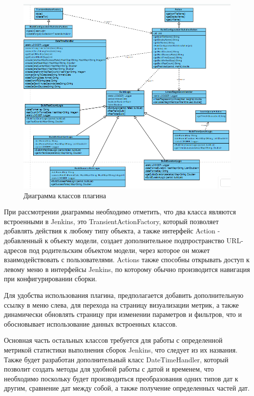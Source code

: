 \begin{figure}[ht!] 
	\center
	\includegraphics [scale=1] {my_folder/images//class3}
	\caption{Диаграмма классов плагина} 
	\label{fig:class3}  
\end{figure}

При рассмотрении диаграммы необходимо отметить, что два класса являются встроенными в Jenkins, это TransientActionFactory, который позволяет добавлять действия к любому типу объекта, а также интерфейс Action - добавленный к объекту модели, создает дополнительное подпространство URL-адресов под родительским объектом модели, через которое он может взаимодействовать с пользователями. Actions также способны открывать доступ к левому меню в интерфейсы Jenkins, по которому обычно производится навигация при конфигурировании сборки.

Для удобства использования плагина, предполагается добавить дополнительную ссылку в меню слева, для перехода на страницу визуализации метрик, а также динамически обновлять страницу при изменении параметров и фильтров, что и обосновывает использование данных встроенных классов.

Основная часть остальных классов требуется для работы с определенной метрикой статистики выполнения сборок Jenkins, что следует из их названия. Также будет разработан дополнительный класс DateTimeHandler, который позволит создать методы для удобной работы с датой и временем, что необходимо поскольку будет производиться преобразования одних типов дат к другим, сравнение дат между собой, а также получение определенных частей дат.

